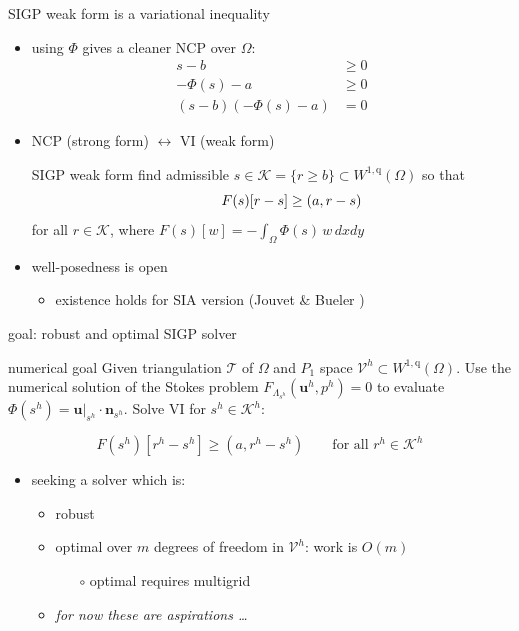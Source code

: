 \documentclass[usepdftitle=false]{beamer}
\newcommand{\bn}{\mathbf{n}}
\newcommand{\bu}{\mathbf{u}}
\newcommand{\ip}[2]{\left(#1,#2\right)}
\newcommand{\qq}{{\text{q}}}
\begin{document}
\begin{frame}{SIGP weak form is a variational inequality}

\begin{itemize}
\item using $\Phi$ gives a cleaner NCP over $\Omega$:
\begin{align*}
s - b &\ge 0 \\
- \Phi(s) - a &\ge 0 \\
(s - b) (- \Phi(s) - a) &= 0
\end{align*}

\item NCP (strong form) $\leftrightarrow$ VI (weak form)

\begin{block}{SIGP weak form}
find admissible $s \in \mathcal{K} = \{r \ge b\} \subset W^{1,\qq}(\Omega)$ so that
    $$\hspace{10mm} F(s)[r - s] \ge \ip{a}{r-s}$$
for all $r \in \mathcal{K}$, where $F(s)[w] = - \int_\Omega \Phi(s)\, w \,dx dy$
\end{block}

\item well-posedness is open
    \begin{itemize}
    \item existence holds for SIA version (Jouvet \& Bueler \cite{JouvetBueler2012})
    \end{itemize}

\end{itemize}

\end{frame}


\begin{frame}{goal: robust and optimal SIGP solver}

\begin{block}{numerical goal}
Given triangulation $\mathcal{T}$ of $\Omega$ and $P_1$ space $\mathcal{V}^h \subset W^{1,\qq}(\Omega)$.  Use the numerical solution of the Stokes problem $F_{\Lambda_{s^h}}(\bu^h,p^h)=0$ to evaluate $\Phi(s^h)=\bu|_{s^h}\cdot\bn_{s^h}$.  Solve VI for $s^h \in \mathcal{K}^h$:

$$F(s^h)[r^h - s^h] \ge \ip{a}{r^h-s^h} \qquad \text{for all $r^h \in \mathcal{K}^h$}$$
\end{block}

\begin{itemize}
\item seeking a solver which is:
    \begin{itemize}
    \item \alert{robust}
    \item \alert{optimal} over $m$ degrees of freedom in $\mathcal{V}^h$: work is $O(m)$
        \begin{itemize}
        \item[{\color{black} $\circ$}] optimal requires multigrid
        \end{itemize}
    \item<2> \emph{for now these are aspirations \dots}
    \end{itemize}
\end{itemize}
\end{frame}
\end{document}
